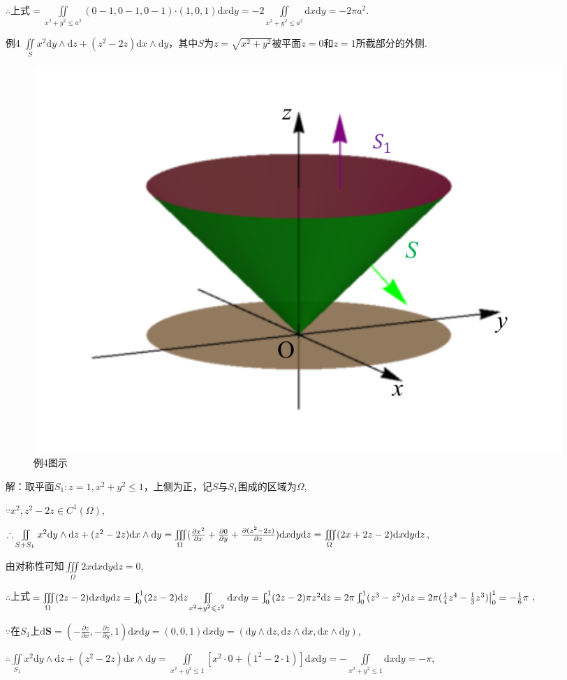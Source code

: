 \documentclass[12pt,UTF8,fleqn]{ctexart}
\newcommand{\Int}[4]{\varint\nolimits_{#1}^{#2}#3\mathrm d#4}
\newcommand{\varIInt}[4]{\iint\limits_{#1}#2\mathrm d#3\mathrm d#4}
\newcommand{\varIIInt}[5]{\iiint\limits_{#1}#2\mathrm d#3\mathrm d#4\mathrm d#5}
\newcommand{\md}[1]{\mathrm d#1}
\newcommand{\BSIInt}[2]{\iint\limits_{#1}#2}
\newcommand{\pp}[2]{\frac{\partial #1}{\partial #2}}
\begin{document}
\begin{enumerate}
$\therefore$上式$=\varIInt{x^2+y^2\leqslant a^2}{(0-1,0-1,0-1)\bm\cdot(1,0,1)}xy=-2\varIInt{x^2+y^2\leqslant a^2}{}xy=-2\pi a^2$.
\item[例4]$\BSIInt S{x^2\md y\wedge\md z+(z^2-2z)\md x\wedge\md y}$，其中$S$为$z=\sqrt{x^2+y^2}$被平面$z=0$和$z=1$所截部分的外侧.

\begin{figure}[H]
\begin{center}
\includegraphics[height=0.5\textheight]{Figures24/Fig13-5-1-5.pdf}
\end{center}
\caption{例4图示}
\label{13-5-1-5}
\end{figure}

解：取平面$S_1:z=1,x^2+y^2\leqslant1$，上侧为正，记$S$与$S_1$围成的区域为$\Omega$,

$\because x^2,z^2-2z\in C^1(\Omega)$,

$\therefore\BSIInt{S+S_1}{x^2\md y\wedge\md z+(z^2-2z)\md x\wedge\md y}=\varIIInt\Omega{(\pp{x^2}x+\pp0y+\pp{(z^2-2z)}z)}xyz\\
=\varIIInt\Omega{(2x+2z-2)}xyz$,

由对称性可知$\varIIInt\Omega{2x}xyz=0$,

$\therefore$上式$=\varIIInt\Omega{(2z-2)}xyz=\Int01{(2z-2)}z\varIInt{x^2+y^2\leqslant z^2}{}xy=\Int01{(2z-2)\pi z^2}z\\
=2\pi\Int01{(z^3-z^2)}z=2\pi(\frac14z^4-\frac13z^3)\big|_0^1=-\frac16\pi$,

$\because$在$S_1$上$\md\bm S=(-\pp zx,-\pp zy,1)\md x\md y=(0,0,1)\md x\md y=(\md y\wedge\md z,\md z\wedge\md x,\md x\wedge\md y)$,

$\therefore\BSIInt{S_1}{x^2\md y\wedge\md z+(z^2-2z)\md x\wedge\md y}=\varIInt{x^2+y^2\leqslant1}{[x^2\cdot0+(1^2-2\cdot1)]}xy=-\varIInt{x^2+y^2\leqslant1}{}xy=-\pi$,


\end{enumerate}
\end{document}

